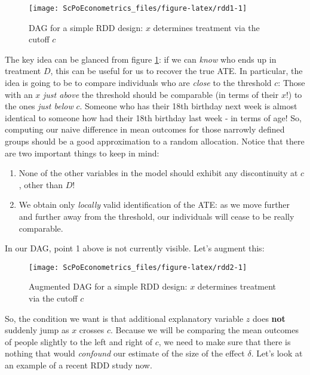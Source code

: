 \documentclass[]{book}
\providecommand{\tightlist}{%
  \setlength{\itemsep}{0pt}\setlength{\parskip}{0pt}}
\begin{document}
\begin{figure}

{\centering \texttt{[image: ScPoEconometrics\_files/figure-latex/rdd1-1]} 

}

\caption{DAG for a simple RDD design: $x$ determines treatment via the cutoff $c$}\label{fig:rdd1}
\end{figure}

The key idea can be glanced from figure \ref{fig:rdd1}: if we can \emph{know} who ends up in treatment \(D\), this can be useful for us to recover the true ATE. In particular, the idea is going to be to compare individuals who are \emph{close} to the threshold \(c\): Those with an \(x\) \emph{just above} the threshold should be comparable (in terms of their \(x\)!) to the ones \emph{just below} \(c\). Someone who has their 18th birthday next week is almost identical to someone how had their 18th birthday last week - in terms of age! So, computing our naive difference in mean outcomes for those narrowly defined groups should be a good approximation to a random allocation. Notice that there are two important things to keep in mind:

\begin{enumerate}
\def\labelenumi{\arabic{enumi}.}
\tightlist
\item
  None of the other variables in the model should exhibit any discontinuity at \(c\), other than \(D\)!
\item
  We obtain only \emph{locally} valid identification of the ATE: as we move further and further away from the threshold, our individuals will cease to be really comparable.
\end{enumerate}

In our DAG, point 1 above is not currently visible. Let's augment this:

\begin{figure}

{\centering \texttt{[image: ScPoEconometrics\_files/figure-latex/rdd2-1]} 

}

\caption{Augmented DAG for a simple RDD design: $x$ determines treatment via the cutoff $c$}\label{fig:rdd2}
\end{figure}

So, the condition we want is that additional explanatory variable \(z\) does \textbf{not} suddenly jump as \(x\) crosses \(c\). Because we will be comparing the mean outcomes of people slightly to the left and right of \(c\), we need to make sure that there is nothing that would \emph{confound} our estimate of the size of the effect \(\delta\). Let's look at an example of a recent RDD study now.
\end{document}
